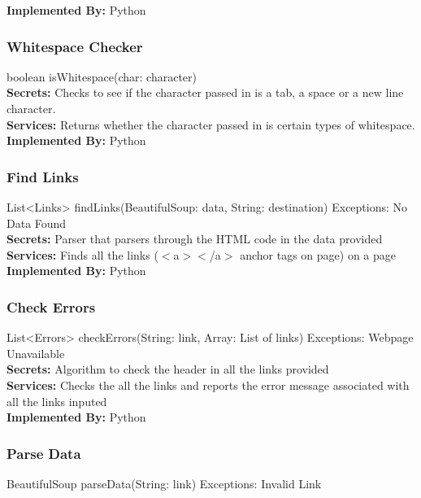 \documentclass[titlepage]{article}
\begin{document}
\textbf{Implemented By:}
Python

\subsubsection{Whitespace Checker}
boolean isWhitespace(char: character)\\

\textbf{Secrets:}
Checks to see if the character passed in is a tab, a space or a new line character.\\

\textbf{Services:}
Returns whether the character passed in is certain types of whitespace.\\

\textbf{Implemented By:}
Python

\subsubsection{Find Links}
List<Links> findLinks(BeautifulSoup: data, String: destination) Exceptions: No Data Found\\

\textbf{Secrets:}
Parser that parsers through the HTML code in the data provided\\

\textbf{Services:}
Finds all the links ($<$a$>$$<$/a$>$ anchor tags on page) on a page \\

\textbf{Implemented By:}
Python

\subsubsection{Check Errors}
List<Errors> checkErrors(String: link, Array: List of links) Exceptions: Webpage Unavailable\\

\textbf{Secrets:}
Algorithm to check the header in all the links provided \\

\textbf{Services:}
Checks the all the links and reports the error message associated with all the links inputed\\

\textbf{Implemented By:} Python

\subsubsection{Parse Data}
BeautifulSoup parseData(String: link) Exceptions: Invalid Link\\
\end{document}
